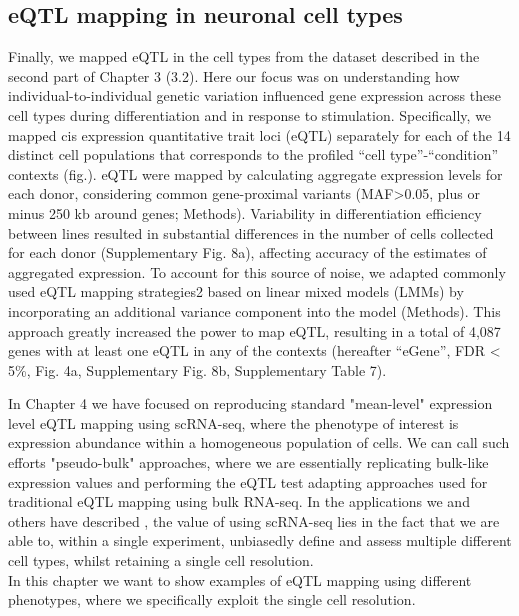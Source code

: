 \subsection{eQTL mapping in neuronal cell types}

Finally, we mapped eQTL in the cell types from the dataset described in the second part of Chapter 3 (3.2).
Here our focus was on understanding how individual-to-individual genetic variation influenced gene expression across these cell types during differentiation and in response to stimulation.
Specifically, we mapped cis expression quantitative trait loci (eQTL) separately for each of the 14 distinct cell populations that corresponds to the profiled “cell type”-“condition” contexts (fig.). 
eQTL were mapped by calculating aggregate expression levels for each donor, considering common gene-proximal variants (MAF>0.05, plus or minus 250 kb around genes; Methods). 
Variability in differentiation efficiency between lines resulted in substantial differences in the number of cells collected for each donor (Supplementary Fig. 8a), affecting accuracy of the estimates of aggregated expression. 
To account for this source of noise, we adapted commonly used eQTL mapping strategies2 based on linear mixed models (LMMs) by incorporating an additional variance component into the model (Methods). 
This approach greatly increased the power to map eQTL, resulting in a total of 4,087 genes with at least one eQTL in any of the contexts (hereafter “eGene”, FDR < 5\%, Fig. 4a, Supplementary Fig. 8b, Supplementary Table 7).


In Chapter 4 we have focused on reproducing standard "mean-level" expression level eQTL mapping using scRNA-seq, where the phenotype of interest is expression abundance within a homogeneous population of cells.
We can call such efforts "pseudo-bulk" approaches, where we are essentially replicating bulk-like expression values and performing the eQTL test adapting approaches used for traditional eQTL mapping using bulk RNA-seq. 
In the applications we and others have described \cite{van2018single,cuomo2020single}, the value of using scRNA-seq lies in the fact that we are able to, within a single experiment, unbiasedly define and assess multiple different cell types, whilst retaining a single cell resolution.\\

In this chapter we want to show examples of eQTL mapping using different phenotypes, where we specifically exploit the single cell resolution.

